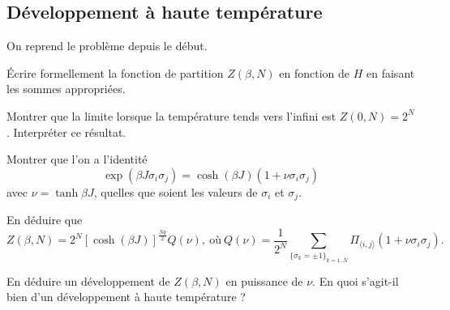 \documentclass[utf8, 11pt]{feuille}
\begin{document}
\subsection{Développement à haute température}
On reprend le problème depuis le début.

\question \'Ecrire formellement la fonction de partition $Z(\beta,N)$ en fonction de $H$ en faisant les sommes appropriées.

\question Montrer que la limite lorsque la température tends vers l'infini est  $Z(0,N)=2^N$. Interpréter ce résultat.

\question Montrer que l'on a l'identité
$$
\exp( \beta J \sigma_i \sigma_j )= \cosh(\beta J) (1+ \nu\sigma_i \sigma_j)
$$
avec $\nu=\tanh{\beta J }$, quelles que soient les valeurs de  $\sigma_i$ et $\sigma_j$.

\question En déduire que 
$$
Z(\beta,N)=2^N [\cosh (\beta J)]^{\frac{Nq}{2}} Q(\nu),
\ \text{où}  \ 
Q(\nu)=\frac{1}{2^N} \sum_{\{\sigma_k=\pm 1 \}_{k=1..N}}\Pi_{\langle i,j \rangle}(1+\nu \sigma_i \sigma_j).
$$

\question En déduire un développement de $Z(\beta,N)$ en puissance de $\nu$. En quoi s'agit-il bien d'un développement à haute température ?


\end{document}
